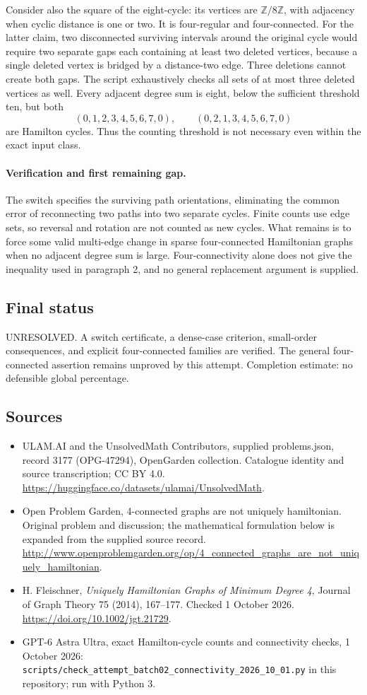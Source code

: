 \documentclass[11pt,a4paper]{article}
\begin{document}
Consider also the square of the eight-cycle: its vertices are
$\mathbb Z/8\mathbb Z$, with adjacency when cyclic distance is one
or two. It is four-regular and four-connected. For the latter claim,
two disconnected surviving intervals around the original cycle would
require two separate gaps each containing at least two deleted
vertices, because a single deleted vertex is bridged by a distance-two
edge. Three deletions cannot create both gaps. The script exhaustively
checks all sets of at most three deleted vertices as well. Every
adjacent degree sum is eight, below the sufficient threshold ten,
but both
\[
 (0,1,2,3,4,5,6,7,0),\qquad (0,2,1,3,4,5,6,7,0)
\]
are Hamilton cycles. Thus the counting threshold is not necessary
even within the exact input class.

\paragraph{Verification and first remaining gap.}
The switch specifies the surviving path orientations, eliminating the
common error of reconnecting two paths into two separate cycles.
Finite counts use edge sets, so reversal and rotation are not counted
as new cycles. What remains is to force some valid multi-edge change
in sparse four-connected Hamiltonian graphs when no adjacent degree
sum is large. Four-connectivity alone does not give the inequality
used in paragraph 2, and no general replacement argument is supplied.

\subsection{Final status}
UNRESOLVED. A switch certificate, a dense-case criterion, small-order
consequences, and explicit four-connected families are verified. The
general four-connected assertion remains unproved by this attempt.
Completion estimate: no defensible global percentage.

\subsection{Sources}
\begin{itemize}
\item[S1] ULAM.AI and the UnsolvedMath Contributors, supplied problems.json, record 3177 (OPG-47294), OpenGarden collection. Catalogue identity and source transcription; CC BY 4.0.
\url{https://huggingface.co/datasets/ulamai/UnsolvedMath}.
\item[S2] Open Problem Garden, 4-connected graphs are not uniquely hamiltonian. Original problem and discussion; the mathematical formulation below is expanded from the supplied source record.
\url{http://www.openproblemgarden.org/op/4_connected_graphs_are_not_uniquely_hamiltonian}.
\item[S3] H. Fleischner, \emph{Uniquely Hamiltonian Graphs of Minimum Degree 4}, Journal of Graph Theory 75 (2014), 167--177. Checked 1 October 2026.
\url{https://doi.org/10.1002/jgt.21729}.
\item[S4] GPT-6 Astra Ultra, exact Hamilton-cycle counts and connectivity checks, 1 October 2026: \texttt{scripts/check\_attempt\_batch02\_connectivity\_2026\_10\_01.py} in this repository; run with Python 3.
\end{itemize}
\end{document}
